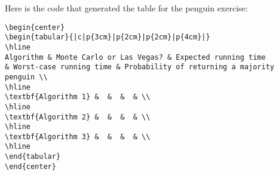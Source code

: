 \documentclass{article}
\begin{document}
\newpage
\normalsize
Here is the code that generated the table for the penguin exercise:

\begin{verbatim}
\begin{center}
\begin{tabular}{|c|p{3cm}|p{2cm}|p{2cm}|p{4cm}|}
\hline
Algorithm & Monte Carlo or Las Vegas? & Expected running time 
& Worst-case running time & Probability of returning a majority penguin \\
\hline
\textbf{Algorithm 1} &  &  &  & \\
\hline
\textbf{Algorithm 2} &  &  &  & \\
\hline
\textbf{Algorithm 3} &  &  &  & \\
\hline
\end{tabular}
\end{center}
\end{verbatim}
\end{document}
